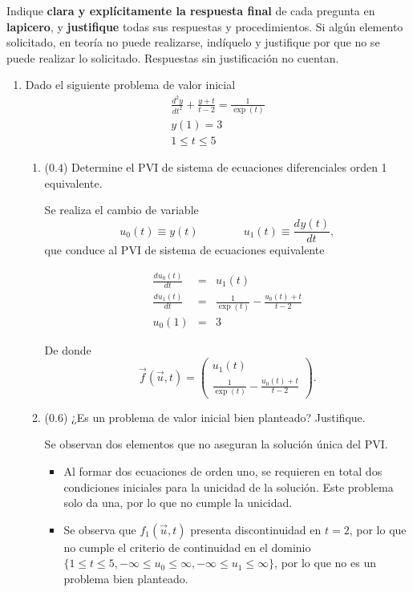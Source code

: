 \documentclass[12pt]{article}
\newcommand{\diff}[3]{\frac{d^{#3} #1}{d#2^{#3}}}
\begin{document}
Indique \textbf{clara y explícitamente la respuesta final} de cada pregunta en \textbf{lapicero}, y \textbf{justifique} todas sus respuestas y procedimientos. Si algún elemento solicitado, en teoría no puede realizarse, indíquelo y justifique por que no se puede realizar lo solicitado. Respuestas sin justificación no cuentan.
  

  \begin{enumerate}[leftmargin=*,widest=9]
    \item Dado el siguiente problema de valor inicial
    \[
    \begin{array}{c}
    \diff{y}{t}{2} + \frac{y+t}{t-2} = \frac{1}{\exp(t)}\\
    y(1) = 3\\
    1 \leq t \leq 5
    \end{array}
    \]     
    
    \begin{enumerate}[label=\alph*]
    \item (\(0.4\)) Determine el PVI de sistema de ecuaciones diferenciales orden 1 equivalente.
    
   Se realiza el cambio de variable
   \[u_0(t) \equiv y(t) \qquad \qquad u_1(t) \equiv \diff{y(t)}{t}{}, \]
   que conduce al PVI de sistema de ecuaciones equivalente
   
   \begin{eqnarray*}
   \diff{u_0(t)}{t}{} &=& u_1(t)\\
   \diff{u_1(t)}{t}{} &=& \frac{1}{\exp(t)}-\frac{u_0(t)+t}{t-2}\\
   u_0(1) &=& 3
   \end{eqnarray*}
   
   De donde
   \[ \vec{f}(\vec{u}, t) = \begin{pmatrix}
   u_1(t) \\ \frac{1}{\exp(t)}-\frac{u_0(t)+t}{t-2}
\end{pmatrix}  .  \]

    \item (\(0.6\)) ¿Es un problema de valor inicial bien planteado? Justifique.
    
   
   Se observan dos elementos que no aseguran la solución única del PVI.
   
   \begin{itemize}
   \item Al formar dos ecuaciones de orden uno, se requieren en total dos condiciones iniciales para la unicidad de la solución. Este problema solo da una, por lo que no cumple la unicidad.
   \item Se observa que \(f_1(\vec{u},t)\) presenta discontinuidad en \(t= 2\), por lo que no cumple el criterio de continuidad en el dominio \(\lbrace 1 \leq t \leq 5, -\infty \leq u_0 \leq \infty, -\infty \leq u_1 \leq \infty \rbrace \), por lo que no es un problema bien planteado.
   \end{itemize}
   

\end{enumerate}
\end{enumerate}
\end{document}
